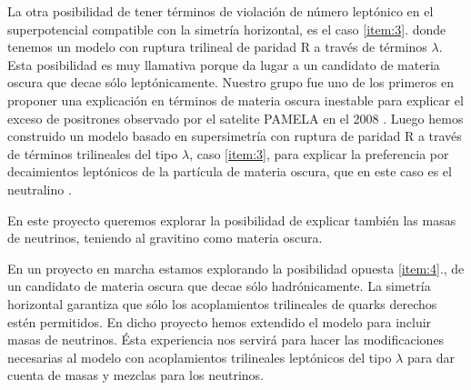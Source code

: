 La otra posibilidad de tener términos de violación de número leptónico
en el superpotencial compatible con la simetría horizontal, es el caso
\ref{item:3}. donde tenemos un modelo con ruptura trilineal de paridad
R a través de términos $\lambda$. Esta posibilidad es muy llamativa
porque da lugar a un candidato de materia oscura que decae sólo
leptónicamente. Nuestro grupo \cite{Nardi:2008ix} fue uno de los
primeros en proponer una explicación en términos de materia oscura
inestable para explicar el exceso de positrones observado por el
satelite PAMELA en el 2008 \cite{Adriani:2008zr}. Luego hemos
construido un modelo basado en supersimetría con ruptura de paridad R
a través de términos trilineales del tipo $\lambda$, caso
\ref{item:3}, para explicar la preferencia por decaimientos leptónicos
de la partícula de materia oscura, que en este caso es el
neutralino \cite{Sierra:2009zq}.
\begin{proyecto}
  En este proyecto queremos explorar la posibilidad de explicar
  también las masas de neutrinos, teniendo al gravitino como materia
  oscura.
\end{proyecto}
En un proyecto en marcha estamos explorando la posibilidad opuesta
\ref{item:4}., de un candidato de materia oscura que decae sólo
hadrónicamente. La simetría horizontal garantiza que sólo los
acoplamientos trilineales de quarks derechos estén permitidos. En
dicho proyecto hemos extendido el modelo para incluir masas de
neutrinos. Ésta experiencia nos servirá para hacer las modificaciones
necesarias al modelo con acoplamientos trilineales leptónicos del tipo
$\lambda$ para dar cuenta de masas y mezclas para los neutrinos.


